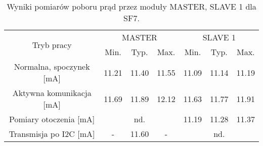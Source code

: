 \renewcommand\theContinuedFloat{\alph{ContinuedFloat}}
\begin{table}[!htbp]
    \ContinuedFloat*
    \centering
    \caption{\label{tab:power-usage-sf7a}Wyniki pomiarów poboru prąd przez moduły MASTER, SLAVE 1 dla SF7.}
    \begin{tabular}{ccccccc}
        \toprule
        \multicolumn{1}{c}{\multirow{2}[4]{*}{Tryb pracy}} & \multicolumn{3}{c}{MASTER} & \multicolumn{3}{c}{SLAVE 1}                                                                                                             \\
        \cmidrule{2-7}                                     & \multicolumn{1}{c}{Min.}   & \multicolumn{1}{c}{Typ.}    & \multicolumn{1}{c}{Max.} & \multicolumn{1}{c}{Min.} & \multicolumn{1}{c}{Typ.} & \multicolumn{1}{c}{Max.} \\
        \midrule
        Normalna, spoczynek [mA]                           & 11.21                      & 11.40                       & 11.55                    & 11.09                    & 11.14                    & 11.19                    \\
        \midrule
        Aktywna komunikacja [mA]                           & 11.69                      & 11.89                       & 12.12                    & 11.63                    & 11.77                    & 11.91                    \\
        \midrule
        Pomiary otoczenia [mA]                             & \multicolumn{3}{c}{nd.}    & 11.19                       & 11.28                    & 11.37                                                                          \\
        \midrule
        Transmisja po I2C [mA]                             & -                          & 11.60                       & -                        & \multicolumn{3}{c}{nd.}                                                        \\
        \bottomrule
    \end{tabular}%
\end{table}%


